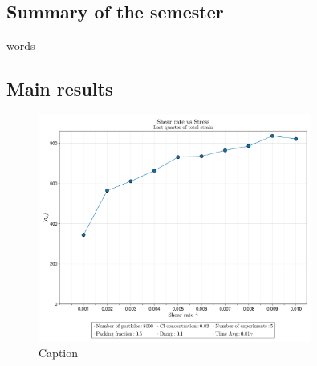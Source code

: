 \documentclass[../main.tex]{subfiles}
\begin{document}
\subsection{Summary of the semester}

words

\subsection{Main results}

\begin{figure}[h]
    \centering
    \includegraphics[width=0.8\textwidth]{../Figures/system-2025-05-22-194804-CL-0.03/ShearRate-vs-Stress.png}
    \caption{Caption}
\end{figure}
\end{document}
